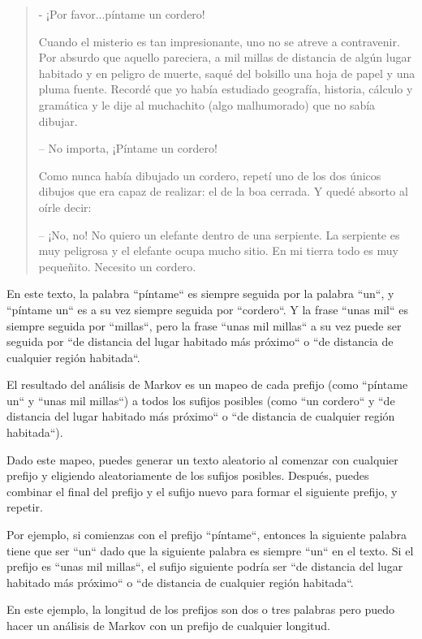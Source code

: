 \begin{quote}
- ¡Por favor...píntame un cordero!

Cuando el misterio es tan impresionante, uno no se atreve a contravenir. Por absurdo
que aquello pareciera, a mil millas de distancia de algún lugar habitado y en peligro 
de muerte, saqué del bolsillo una hoja de papel y una pluma fuente. Recordé que
yo había estudiado geografía, historia, cálculo y gramática y le dije al muchachito (algo 
malhumorado) que no sabía dibujar.

– No importa, ¡Píntame un cordero!

Como nunca había dibujado un cordero, repetí uno de los dos únicos dibujos 
que era capaz de realizar: el de la boa cerrada. Y quedé absorto al oírle decir:

– ¡No, no! No quiero un elefante dentro de una serpiente. La serpiente es muy
peligrosa y el elefante ocupa mucho sitio. En mi tierra todo es muy pequeñito.
Necesito un cordero.

\end{quote}

%
En este texto, la palabra ``píntame`` es siempre seguida por la palabra ``un``,
y ``píntame un`` es a su vez siempre seguida por ``cordero``. Y la frase ``unas mil``
es siempre seguida por ``millas``, pero la frase ``unas mil millas`` a su vez puede ser
seguida por ``de distancia del lugar habitado más próximo`` o ``de distancia de cualquier región
habitada``.

El resultado del análisis de Markov es un mapeo de cada prefijo (como
``píntame un`` y ``unas mil millas``) a todos los sufijos posibles (como
``un cordero`` y  ``de distancia del lugar habitado más próximo`` o 
``de distancia de cualquier región habitada``).

Dado este mapeo, puedes generar un texto aleatorio al comenzar con
cualquier prefijo y eligiendo aleatoriamente de los sufijos posibles.
Después, puedes combinar el final del prefijo y el sufijo nuevo para
formar el siguiente prefijo, y repetir.

Por ejemplo, si comienzas con el prefijo ``píntame``, entonces la siguiente
palabra tiene que ser ``un`` dado que la siguiente palabra es siempre
``un`` en el texto. Si el prefijo es ``unas mil millas``, el sufijo siguiente
podría ser ``de distancia del lugar habitado más próximo`` o 
``de distancia de cualquier región habitada``.

En este ejemplo, la longitud de los prefijos son dos o tres palabras
pero puedo hacer un análisis de Markov con un prefijo de cualquier
longitud.

